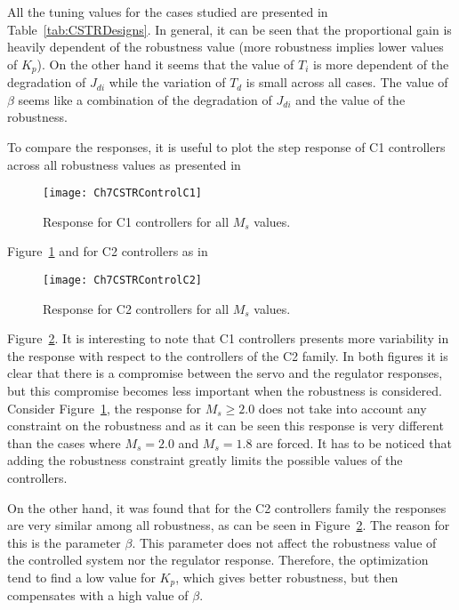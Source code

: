 All the tuning values for the cases studied are presented in Table~\ref{tab:CSTRDesigns}. In general, it can be seen that the proportional gain is heavily dependent of the robustness value (more robustness implies lower values of $K_p$). On the other hand it seems that the value of $T_i$ is more dependent of the degradation of $J_{di}$ while the variation of $T_d$ is small across all cases. The value of $\beta$ seems like a combination of the degradation of $J_{di}$ and the value of the robustness.

To compare the responses, it is useful to plot the step response of C1 controllers across all robustness values as presented in %
\begin{figure}[tb]
	\centering
	\texttt{[image: Ch7CSTRControlC1]}
	\caption{Response for C1 controllers for all $M_s$ values.}
	\label{fig:Ch7CSTRControlC1}
\end{figure}
%
Figure~\ref{fig:Ch7CSTRControlC1} and for C2 controllers as in %
\begin{figure}[tb]
	\centering
	\texttt{[image: Ch7CSTRControlC2]}
	\caption{Response for C2 controllers for all $M_s$ values.}
	\label{fig:Ch7CSTRControlC2}
\end{figure}
%
Figure~\ref{fig:Ch7CSTRControlC2}. It is interesting to note that C1 controllers presents more variability in the response with respect to the controllers of the C2 family. In both figures it is clear that there is a compromise between the servo and the regulator responses, but this compromise becomes less important when the robustness is considered. Consider Figure~\ref{fig:Ch7CSTRControlC1}, the response for $M_s \geq 2.0$ does not take into account any constraint on the robustness and as it can be seen this response is very different than the cases where $M_s = 2.0$ and $M_s = 1.8$ are forced. It has to be noticed that adding the robustness constraint greatly limits the possible values of the controllers.

On the other hand, it was found that for the C2 controllers family the responses are very similar among all robustness, as can be seen in Figure~\ref{fig:Ch7CSTRControlC2}. The reason for this is the parameter $\beta$. This parameter does not affect the robustness value of the controlled system nor the regulator response. Therefore, the optimization tend to find a low value for $K_p$, which gives better robustness, but then compensates with a high value of $\beta$.

